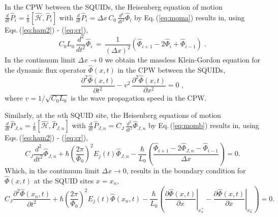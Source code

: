 In the CPW between the SQUIDs, the Heisenberg equation of motion 
$\displaystyle \frac{d}{dt} \hat{P}_i = \frac{i}{\hbar} \left[\hat{\mathcal{H}}, \hat{P}_i \right]$ 
with
$\displaystyle \frac{d}{dt} \hat{P}_i = \Delta x \, C_0 \, \frac{d^2}{dt^2} \hat{\Phi}_i$ 
by Eq.\,(\ref{eq:moma}) results in, using Eqs.\,(\ref{eq:ham2}) - (\ref{eq:cr}), 
%
\begin{equation} \label{eq:eom1}
C_0 L_0 \, \frac{d^2}{dt^2} \hat{\Phi}_i \, = \, 
\frac{1}{(\Delta x)^2} \left(\hat{\Phi}_{i+1} - 2 \hat{\Phi}_i +  \hat{\Phi}_{i-1} \right) \, \, .
\end{equation}
%
In the continuum limit $\Delta x \to 0$ we obtain the massless Klein-Gordon equation 
for the dynamic flux operator $\hat{\Phi}(x,t)$ in the CPW between the SQUIDs,
%
\begin{equation} \label{eq:eom2}
\frac{\partial^2\hat{\Phi}(x,t)}{\partial t^2} - v^2 \, \frac{\partial^2\hat{\Phi}(x,t)}{\partial x^2} = 0 \, \, ,
\end{equation}
%
where $v = 1 / \sqrt{C_0 L_0}$ is the wave propagation speed in the CPW.

\color{black}
Similarly, at the $n$th SQUID site, the Heisenberg equations of motion
$\displaystyle \frac{d}{dt} \hat{P}_{J, n} = \frac{i}{\hbar} \left[\hat{\mathcal{H}}, \hat{P}_{J, n} \right]$ 
with
$\displaystyle \frac{d}{dt} \hat{P}_{J,n} = C_J \, \frac{d^2}{dt^2} \hat{\Phi}_{J, n}$ 
by Eq.\,(\ref{eq:momb}) results in, using Eqs.\,(\ref{eq:ham2}) - (\ref{eq:cr}), 
%
\begin{equation}\label{BC_discrete}
C_{J} \frac{d^2}{dt^2} \hat{\Phi}_{J,n} +\hbar\left(\frac{2 \pi}{\Phi_{0}}\right)^{2} E_{j}(t) \hat{\Phi}_{J, n} -\frac{\hbar}{L_{0}}\left(\frac{\hat{\Phi}_{i+1} - 2 \hat{\Phi}_{J, n} - \hat{\Phi}_{i-1}}{\Delta x}\right)=0.
\end{equation}
%
Which, in the continuum limit $\Delta x \to 0$, results in the boundary condition for $\hat{\Phi}(x, t)$ at the SQUID sites $x = x_n$,
%
\begin{equation}\label{eq:BC_field_orig}
C_{J} \frac{\partial^2 \hat{\Phi}(x_n, t)}{\partial t^2} +\hbar\left(\frac{2 \pi}{\Phi_{0}}\right)^{2} E_{j}(t) \hat{\Phi}(x_n, t) -\frac{\hbar}{L_{0}}\left(\left.\frac{\partial \hat{\Phi}(x, t)}{\partial x}\right|_{x_n^{+}}-\left.\frac{\partial \hat{\Phi}(x,t)}{\partial x}\right|_{x_n^{-}}\right)=0.
\end{equation}

